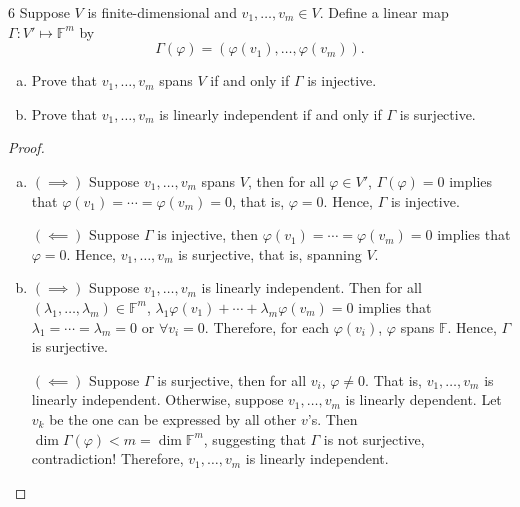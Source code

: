 \documentclass{article}
\newenvironment{problem}[1]{\begin{prob*}{#1}{}}{\end{prob*}}
\begin{document}
\begin{problem}{6}
Suppose $V$ is finite-dimensional and $v_1, \ldots , v_m \in V$. Define a linear map $\Gamma : V' \mapsto \mathbb{F}^{m}$ by \[
	\Gamma(\varphi) = (\varphi(v_1), \ldots , \varphi(v_m)).\]
\begin{enumerate}[(a)]
	\item Prove that $v_1, \ldots , v_m$ spans $V$ if and only if $\Gamma$ is injective.
	\item Prove that $v_1, \ldots , v_m$ is linearly independent if and only if $\Gamma$ is surjective.
\end{enumerate}
\end{problem}
\begin{proof}
	\begin{enumerate}[(a)]
		\item $(\implies)$ Suppose $v_1, \ldots, v_m$ spans $V$, then for all $\varphi \in V'$, $\Gamma(\varphi) = 0$ implies that $\varphi(v_1) = \cdots = \varphi(v_m) = 0$, that is, $\varphi = 0$. Hence, $\Gamma$ is injective. \par
		      $(\impliedby)$ Suppose $\Gamma$ is injective, then $\varphi(v_1) = \cdots = \varphi(v_m) = 0$ implies that $\varphi = 0$. Hence, $v_1, \ldots , v_m$ is surjective, that is, spanning $V$.
		\item $(\implies)$ Suppose $v_1, \ldots , v_m$ is linearly independent. Then for all $(\lambda_1, \ldots , \lambda_m) \in \mathbb{F}^m$, $\lambda_1\varphi(v_1) + \cdots + \lambda_m\varphi(v_m) = 0$ implies that $\lambda_1 = \cdots = \lambda_m = 0$ or $\forall v_i = 0$. Therefore, for each $\varphi(v_i)$, $\varphi$ spans $\mathbb{F}$. Hence, $\Gamma$ is surjective. \par
		      $(\impliedby)$ Suppose $\Gamma$ is surjective, then for all $v_i$, $\varphi \neq 0.$ That is, $v_1, \ldots , v_m$ is linearly independent. Otherwise, suppose $v_1, \ldots ,v_m$ is linearly dependent. Let $v_k$ be the one can be expressed by all other $v$'s. Then $\operatorname{dim}\Gamma(\varphi) < m = \operatorname{dim} \mathbb{F}^m$, suggesting that $\Gamma$ is not surjective, contradiction! Therefore, $v_1, \ldots ,v_m$ is linearly independent.
	\end{enumerate}
\end{proof}
\end{document}
